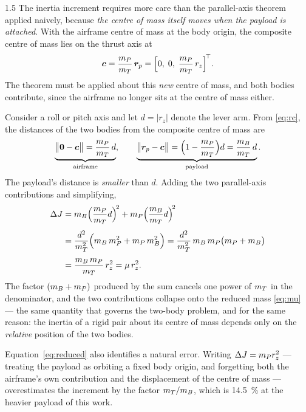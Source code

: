 \begin{spacing}{1.5}
The inertia increment requires more care than the parallel-axis theorem applied
naively, because \emph{the centre of mass itself moves when the payload is
attached}. With the airframe centre of mass at the body origin, the composite
centre of mass lies on the thrust axis at
\begin{equation}
\bm{c} = \frac{m_P}{m_T}\, \bm{r}_p = \Bigl[0,\; 0,\; \frac{m_P}{m_T}\,r_z\Bigr]^{\!\top}.
\label{eq:rc}
\end{equation}
The theorem must be applied about this \emph{new} centre of mass, and both bodies
contribute, since the airframe no longer sits at the centre of mass either.

Consider a roll or pitch axis and let $d=|r_z|$ denote the lever arm. From
\eqref{eq:rc}, the distances of the two bodies from the composite centre of mass
are
\begin{equation}
\underbrace{\bigl\| \bm{0} - \bm{c} \bigr\| = \frac{m_P}{m_T}\, d}_{\text{airframe}},
\qquad
\underbrace{\bigl\| \bm{r}_p - \bm{c} \bigr\| = \Bigl( 1 - \frac{m_P}{m_T} \Bigr) d = \frac{m_B}{m_T}\, d}_{\text{payload}} .
\label{eq:dists}
\end{equation}
The payload's distance is \emph{smaller} than $d$. Adding the two
parallel-axis contributions and simplifying,
\begin{align}
\Delta J
&= m_B \Bigl( \frac{m_P}{m_T} d \Bigr)^{\!2}
 + m_P \Bigl( \frac{m_B}{m_T} d \Bigr)^{\!2} \nonumber \\[4pt]
&= \frac{d^2}{m_T^2}\Bigl( m_B\, m_P^2 + m_P\, m_B^2 \Bigr)
 = \frac{d^2}{m_T^2}\, m_B\, m_P \bigl( m_P + m_B \bigr) \nonumber \\[4pt]
&= \frac{m_B\, m_P}{m_T}\, r_z^2
 = \mu\, r_z^2 .
\label{eq:reduced}
\end{align}
The factor $(m_B + m_P)$ produced by the sum cancels one power of $m_T$ in the
denominator, and the two contributions collapse onto the reduced mass
\eqref{eq:mu} --- the same quantity that governs the two-body problem, and for
the same reason: the inertia of a rigid pair about its centre of mass depends
only on the \emph{relative} position of the two bodies.

Equation~\eqref{eq:reduced} also identifies a natural error. Writing
$\Delta J = m_P r_z^2$ --- treating the payload as orbiting a fixed body origin, and
forgetting both the airframe's own contribution and the displacement of the
centre of mass --- overestimates the increment by the factor $m_T / m_B$, which
is \SI{14.5}{\percent} at the heavier payload of this work.


\end{spacing}

